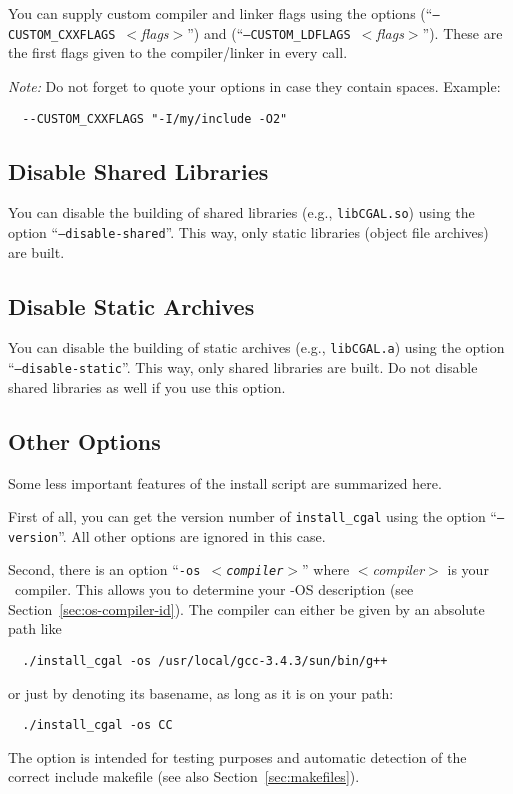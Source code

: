 You can supply custom compiler and linker flags using the options
\mbox{(``\texttt{--CUSTOM\_CXXFLAGS}
  \textit{$<$flags$>$}'')} and
\mbox{(``\texttt{--CUSTOM\_LDFLAGS}
  \textit{$<$flags$>$}'')}. These are the
first flags given to the compiler/linker in every call.

\textit{Note:} Do not forget to quote your options in case they
contain spaces. Example:
\begin{verbatim}
  --CUSTOM_CXXFLAGS "-I/my/include -O2"
\end{verbatim}


\subsection{Disable Shared Libraries\label{sec:disable-shared-setup}}

You can disable the building of shared libraries (e.g.,
\texttt{libCGAL.so}) using the option
\mbox{``\texttt{--disable-shared}''}. This
way, only static libraries (object file archives) are built.

\subsection{Disable Static Archives\label{sec:disable-static-setup}}

You can disable the building of static archives (e.g.,
\texttt{libCGAL.a}) using the option
\mbox{``\texttt{--disable-static}''}. This
way, only shared libraries are built. Do not disable shared libraries as
well if you use this option.

\subsection{Other Options\label{sec:other-options}}

Some less important features of the install script are summarized
here.

First of all, you can get the version number of \texttt{install\_cgal}
using the option ``\texttt{--version}''. All other options are ignored
in this case.

Second, there is an option ``\texttt{-os \textit{$<$compiler$>$}}''
where \textit{$<$compiler$>$} is your \CC\ compiler. This allows you
to determine your \cgal-OS description (see
Section~\ref{sec:os-compiler-id}). The compiler can either be given by
an absolute path like
\begin{verbatim}
  ./install_cgal -os /usr/local/gcc-3.4.3/sun/bin/g++
\end{verbatim}
or just by denoting its basename, as long as it is on your path:
\begin{verbatim}
  ./install_cgal -os CC
\end{verbatim}
The option is intended for testing purposes and automatic detection of
the correct include makefile (see also Section~\ref{sec:makefiles}).

